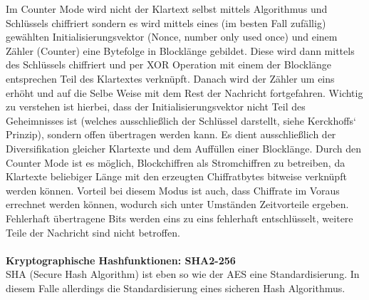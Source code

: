 \documentclass[12pt,a4paper,bibliography=totocnumbered,listof=totocnumbered]{scrartcl}
\begin{document}
Im Counter Mode wird nicht der Klartext selbst mittels Algorithmus und Schlüssels chiffriert sondern es wird mittels eines (im besten Fall zufällig) gewählten Initialisierungsvektor (Nonce, number only used once) und einem Zähler (Counter) eine Bytefolge in Blocklänge gebildet. Diese wird dann mittels des Schlüssels chiffriert und per XOR Operation mit einem der Blocklänge entsprechen Teil des Klartextes verknüpft. Danach wird der Zähler um eins erhöht und auf die Selbe Weise mit dem Rest der Nachricht fortgefahren. Wichtig zu verstehen ist hierbei, dass der Initialisierungsvektor nicht Teil des Geheimnisses ist (welches ausschließlich der Schlüssel darstellt, siehe Kerckhoffs‘ Prinzip), sondern offen übertragen werden kann. Es dient ausschließlich der Diversifikation gleicher Klartexte und dem Auffüllen einer Blocklänge. Durch den Counter Mode ist es möglich, Blockchiffren als Stromchiffren zu betreiben, da Klartexte beliebiger Länge mit den erzeugten Chiffratbytes bitweise verknüpft werden können. Vorteil bei diesem Modus ist auch, dass Chiffrate im Voraus errechnet werden können, wodurch sich unter Umständen Zeitvorteile ergeben. Fehlerhaft übertragene Bits werden eins zu eins fehlerhaft entschlüsselt, weitere Teile der Nachricht sind nicht betroffen. \cite{6}\cite{7}\\
\\\textbf{Kryptographische Hashfunktionen: SHA2-256}\\
SHA (Secure Hash Algorithm) ist eben so wie der AES eine Standardisierung. In diesem Falle allerdings die Standardisierung eines sicheren Hash Algorithmus. 
\end{document}
